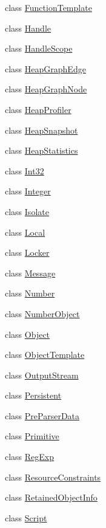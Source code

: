 \begin{DoxyCompactItemize}
class \hyperlink{classv8_1_1_function_template}{Function\+Template}
\item 
class \hyperlink{classv8_1_1_handle}{Handle}
\item 
class \hyperlink{classv8_1_1_handle_scope}{Handle\+Scope}
\item 
class \hyperlink{classv8_1_1_heap_graph_edge}{Heap\+Graph\+Edge}
\item 
class \hyperlink{classv8_1_1_heap_graph_node}{Heap\+Graph\+Node}
\item 
class \hyperlink{classv8_1_1_heap_profiler}{Heap\+Profiler}
\item 
class \hyperlink{classv8_1_1_heap_snapshot}{Heap\+Snapshot}
\item 
class \hyperlink{classv8_1_1_heap_statistics}{Heap\+Statistics}
\item 
class \hyperlink{classv8_1_1_int32}{Int32}
\item 
class \hyperlink{classv8_1_1_integer}{Integer}
\item 
class \hyperlink{classv8_1_1_isolate}{Isolate}
\item 
class \hyperlink{classv8_1_1_local}{Local}
\item 
class \hyperlink{classv8_1_1_locker}{Locker}
\item 
class \hyperlink{classv8_1_1_message}{Message}
\item 
class \hyperlink{classv8_1_1_number}{Number}
\item 
class \hyperlink{classv8_1_1_number_object}{Number\+Object}
\item 
class \hyperlink{classv8_1_1_object}{Object}
\item 
class \hyperlink{classv8_1_1_object_template}{Object\+Template}
\item 
class \hyperlink{classv8_1_1_output_stream}{Output\+Stream}
\item 
class \hyperlink{classv8_1_1_persistent}{Persistent}
\item 
class \hyperlink{classv8_1_1_pre_parser_data}{Pre\+Parser\+Data}
\item 
class \hyperlink{classv8_1_1_primitive}{Primitive}
\item 
class \hyperlink{classv8_1_1_reg_exp}{Reg\+Exp}
\item 
class \hyperlink{classv8_1_1_resource_constraints}{Resource\+Constraints}
\item 
class \hyperlink{classv8_1_1_retained_object_info}{Retained\+Object\+Info}
\item 
class \hyperlink{classv8_1_1_script}{Script}

\end{DoxyCompactItemize}
